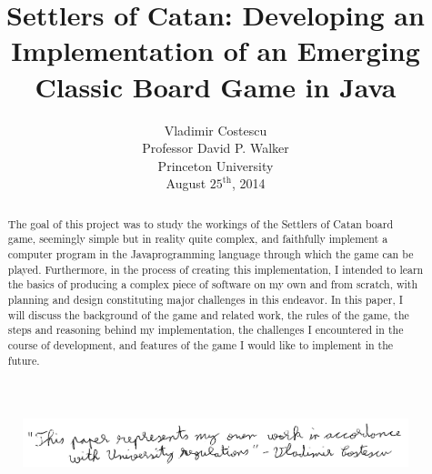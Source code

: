 \documentclass[pageno]{jpaper}
\begin{document}
\lstset{language=Java,basicstyle=\ttfamily}

\title{
Settlers of Catan: Developing an Implementation of an Emerging Classic Board Game in Java}
\date{}

\author{Vladimir Costescu \\ Professor David P. Walker \\ Princeton University \\ August $25^{\text{th}}$, 2014}
\maketitle
\vspace*{\fill}
\begin{figure}
\centering
\includegraphics[width=150mm]{honor_code.png}
\end{figure}
\thispagestyle{empty} %

\newpage
\tableofcontents
\thispagestyle{empty}
\newpage

\begin{abstract}
The goal of this project was to study the workings of the Settlers of Catan\textsuperscript{\textregistered} board game, seemingly simple but in reality quite complex, and faithfully implement a computer program in the Java\texttrademark programming language through which the game can be played. Furthermore, in the process of creating this implementation, I intended to learn the basics of producing a complex piece of software on my own and from scratch, with planning and design constituting major challenges in this endeavor. In this paper, I will discuss the background of the game and related work, the rules of the game, the steps and reasoning behind my implementation, the challenges I encountered in the course of development, and features of the game I would like to implement in the future.
\end{abstract}
\end{document}
